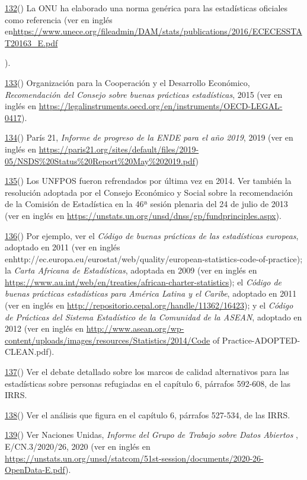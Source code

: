 \documentclass[
]{book}
\begin{document}
\protect\hyperlink{sdfootnote132anc}{132}() La ONU ha elaborado una norma genérica para las estadísticas oficiales como referencia (ver en inglés en\url{https://www.unece.org/fileadmin/DAM/stats/publications/2016/ECECESSTAT20163_E.pdf}

).

\protect\hyperlink{sdfootnote133anc}{133}() Organización para la Cooperación y el Desarrollo Económico, \emph{Recomendación del Consejo sobre buenas prácticas estadísticas}, 2015 (ver en inglés en \url{https://legalinstruments.oecd.org/en/instruments/OECD-LEGAL-0417}).

\protect\hyperlink{sdfootnote134anc}{134}() París 21, \emph{Informe de progreso de la ENDE para el año 2019}, 2019 (ver en inglés en \url{https://paris21.org/sites/default/files/2019-05/NSDS\%20Status\%20Report\%20May\%202019.pdf})

\protect\hyperlink{sdfootnote135anc}{135}() Los UNFPOS fueron refrendados por última vez en 2014. Ver también la resolución adoptada por el Consejo Económico y Social sobre la recomendación de la Comisión de Estadística en la 46ª sesión plenaria del 24 de julio de 2013 (ver en inglés en \url{https://unstats.un.org/unsd/dnss/gp/fundprinciples.aspx}).

\protect\hyperlink{sdfootnote136anc}{136}() Por ejemplo, ver el \emph{Código de buenas prácticas de las estadísticas europeas}, adoptado en 2011 (ver en inglés enhttp://ec.europa.eu/eurostat/web/quality/european-statistics-code-of-practice); la \emph{Carta Africana de Estadísticas}, adoptada en 2009 (ver en inglés en \url{https://www.au.int/web/en/treaties/african-charter-statistics}); el \emph{Código de buenas prácticas estadísticas para América Latina y el Caribe}, adoptado en 2011 (ver en inglés en \url{http://repositorio.cepal.org/handle/11362/16423}); y el \emph{Código de Prácticas del Sistema Estadístico de la Comunidad de la ASEAN}, adoptado en 2012 (ver en inglés en \url{http://www.asean.org/wp-content/uploads/images/resources/Statistics/2014/Code} of Practice-ADOPTED-CLEAN.pdf).

\protect\hyperlink{sdfootnote137anc}{137}() Ver el debate detallado sobre los marcos de calidad alternativos para las estadísticas sobre personas refugiadas en el capítulo 6, párrafos 592-608, de las IRRS.

\protect\hyperlink{sdfootnote138anc}{138}() Ver el análisis que figura en el capítulo 6, párrafos 527-534, de las IRRS.

\protect\hyperlink{sdfootnote139anc}{139}() Ver Naciones Unidas, \emph{Informe del Grupo de Trabajo sobre Datos Abiertos} , E/CN.3/2020/26, 2020 (ver en inglés en \url{https://unstats.un.org/unsd/statcom/51st-session/documents/2020-26-OpenData-E.pdf}).
\end{document}
